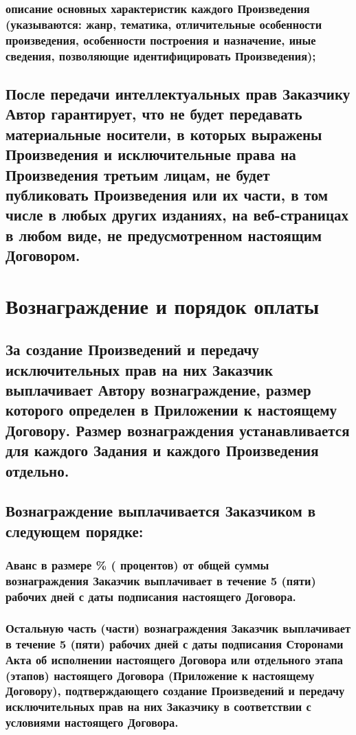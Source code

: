 \documentclass[12pt]{article}
\begin{document}
\subsubsection{описание основных характеристик каждого Произведения (указываются: жанр, тематика, отличительные особенности произведения, особенности построения и назначение, иные сведения, позволяющие идентифицировать Произведения);}

\subsection{После передачи интеллектуальных прав Заказчику Автор гарантирует, что не будет передавать материальные носители, в которых выражены Произведения и исключительные права на Произведения третьим лицам, не будет публиковать Произведения или их части, в том числе в любых других изданиях, на веб-страницах в любом виде, не предусмотренном настоящим Договором.}

\section{Вознаграждение и порядок оплаты}

\subsection{За создание Произведений и передачу исключительных прав на них Заказчик выплачивает Автору вознаграждение, размер которого определен в Приложении  к настоящему Договору. Размер вознаграждения устанавливается для каждого Задания и каждого Произведения отдельно.}

\subsection{Вознаграждение выплачивается Заказчиком в следующем порядке:}

\subsubsection{Аванс в размере \underline{\hspace{0.75cm}}\% (\underline{\hspace{4cm}} процентов) от общей суммы вознаграждения Заказчик выплачивает в течение 5 (пяти) рабочих дней с даты подписания настоящего Договора.}

\subsubsection{Остальную часть (части) вознаграждения Заказчик выплачивает в течение 5 (пяти) рабочих дней с даты подписания Сторонами Акта об исполнении настоящего Договора или отдельного этапа (этапов) настоящего Договора (Приложение  к настоящему Договору), подтверждающего создание Произведений и передачу исключительных прав на них Заказчику в соответствии с условиями настоящего Договора.}
\end{document}

